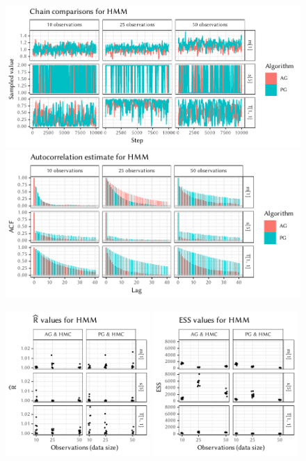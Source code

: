 \begin{figure}[p]
  \centering
  \includegraphics[width=\textwidth]{figures/HMM-chains}
  \par
  \includegraphics[width=\textwidth]{figures/HMM-acfs}
  \par
  \includegraphics[width=0.49\textwidth]{figures/HMM-rhat}
  \includegraphics[width=0.49\textwidth]{figures/HMM-ess}
\end{figure}

